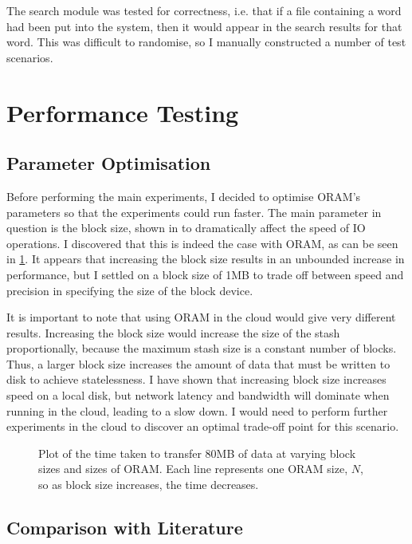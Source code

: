 \documentclass[12pt,a4paper,twoside,openright]{report}
\begin{document}
The search module was tested for correctness, i.e. that if a file containing a word had been put into the system, then it would appear in the search results for that word. This was difficult to randomise, so I manually constructed a number of test scenarios.

\section{Performance Testing}
\label{sec:performanceTesting}

\subsection{Parameter Optimisation}
\label{sub:parameterOptimisation}

Before performing the main experiments, I decided to optimise ORAM's parameters so that the experiments could run faster. The main parameter in question is the block size, shown in \citet{ousterhout1985trace} to dramatically affect the speed of IO operations. I discovered that this is indeed the case with ORAM, as can be seen in \cref{fig:blockSizeResults}. It appears that increasing the block size results in an unbounded increase in performance, but I settled on a block size of 1MB to trade off between speed and precision in specifying the size of the block device.

It is important to note that using ORAM in the cloud would give very different results. Increasing the block size would increase the size of the stash proportionally, because the maximum stash size is a constant number of blocks. Thus, a larger block size increases the amount of data that must be written to disk to achieve statelessness. I have shown that increasing block size increases speed on a local disk, but network latency and bandwidth will dominate when running in the cloud, leading to a slow down. I would need to perform further experiments in the cloud to discover an optimal trade-off point for this scenario.

\begin{figure}
    \centering
    
    \caption{Plot of the time taken to transfer 80MB of data at varying block sizes and sizes of ORAM. Each line represents one ORAM size, $N$, so as block size increases, the time decreases.}
    \label{fig:blockSizeResults}
\end{figure}

\subsection{Comparison with Literature}
\label{subsec:comparisonWithLiterature}
\end{document}
